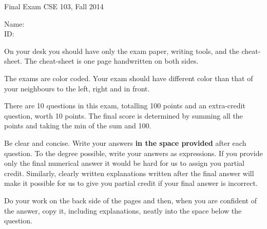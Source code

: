{\textbf \Large Final Exam} \hfill CSE 103, Fall 2014
\\

\vspace{.25in}

Name: \underline{\hspace{3in}}
\\

ID: \underline{\hspace{3.2in}}
\\

\vspace{1in}

On your desk you should have only the exam paper, writing tools, and
the cheat-sheet. The cheat-sheet is one page handwritten on both sides.

The exams are color coded. Your exam should have different color than that of your neighbours to the left, right and in front.

There are 10 questions in this exam, totalling 100 points and an
extra-credit question, worth 10 points. The final score is determined
by summing all the points and taking the min of the sum and 100.

Be clear and concise. Write your answers {\bf in the space provided}
after each question. To the degree possible, write your answers as
expressions. If you provide only the final numerical answer it would
be hard for us to assign you partial credit. Similarly, clearly
written explanations written after the final answer will make it
possible for us to give you partial credit if your final answer is
incorrect.

Do your work on the back side of the pages and then, when you are
confident of the answer, copy it, including explanations, 
neatly into the space below the question.
\vspace{0.4in}

